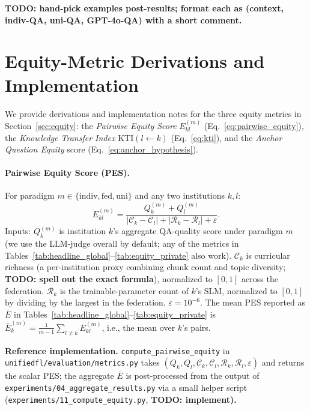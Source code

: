 \documentclass[11pt]{article}
\theoremstyle{plain}
\theoremstyle{definition}
\theoremstyle{remark}
\newcommand{\red}[1]{\textcolor{myred}{\textbf{#1}}}
\newcommand{\indiv}{\text{indiv}}
\newcommand{\fed}{\text{fed}}
\newcommand{\uni}{\text{uni}}
\begin{document}
\red{TODO: hand-pick examples post-results; format each as (context, indiv-QA, uni-QA, GPT-4o-QA) with a short comment.}

\section{Equity-Metric Derivations and Implementation}
\label{app:equity_derivations}

We provide derivations and implementation notes for
the three equity metrics in Section~\ref{sec:equity}: the
\emph{Pairwise Equity Score} $E_{kl}^{(m)}$
(Eq.~\ref{eq:pairwise_equity}), the
\emph{Knowledge Transfer Index}
$\mathrm{KTI}(l\leftarrow k)$ (Eq.~\ref{eq:kti}),
and the \emph{Anchor Question Equity} score
(Eq.~\ref{eq:anchor_hypothesis}).

\paragraph{Pairwise Equity Score (PES).}
For paradigm $m \in \{\indiv, \fed, \uni\}$ and any
two institutions $k, l$:
\begin{equation}
  E_{kl}^{(m)} =
  \frac{Q_k^{(m)} + Q_l^{(m)}}
       {|\mathcal{C}_k - \mathcal{C}_l| +
        |\mathcal{R}_k - \mathcal{R}_l| + \varepsilon}.
  \label{eq:pairwise_equity}
\end{equation}
Inputs: $Q_k^{(m)}$ is institution $k$'s aggregate
QA-quality score under paradigm $m$ (we use the
LLM-judge overall by default; any of the metrics in
Tables~\ref{tab:headline_global}--\ref{tab:equity_private}
also work). $\mathcal{C}_k$ is curricular richness
(a per-institution proxy combining chunk count and
topic diversity; \red{TODO: spell out the exact
formula}), normalized to $[0, 1]$ across the
federation. $\mathcal{R}_k$ is the
trainable-parameter count of $k$'s SLM, normalized
to $[0, 1]$ by dividing by the largest in the
federation. $\varepsilon = 10^{-6}$.
The mean PES reported as $\bar{E}$ in
Tables~\ref{tab:headline_global}--\ref{tab:equity_private}
is $\bar{E}_k^{(m)} = \frac{1}{m-1}\sum_{l \neq k}
E_{kl}^{(m)}$, i.e., the mean over $k$'s pairs.

\textbf{Reference implementation.}
\texttt{compute\_pairwise\_equity} in
\texttt{unifiedfl/evaluation/metrics.py} takes
$(Q_k, Q_l, \mathcal{C}_k, \mathcal{C}_l,
\mathcal{R}_k, \mathcal{R}_l, \varepsilon)$ and
returns the scalar PES; the aggregate $\bar{E}$ is
post-processed from the output of
\texttt{experiments/04\_aggregate\_results.py} via a
small helper script
(\texttt{experiments/11\_compute\_equity.py},
\red{TODO: implement).}
\end{document}
